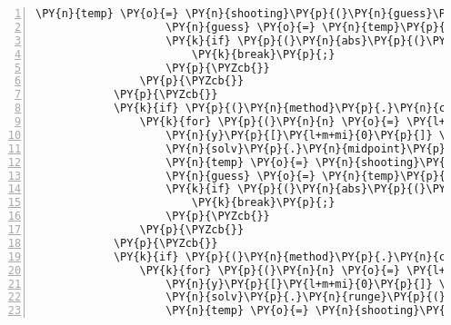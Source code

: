 \begin{Verbatim}[commandchars=\\\{\},numbers=left,firstnumber=1,stepnumber=1]
					\PY{n}{temp} \PY{o}{=} \PY{n}{shooting}\PY{p}{(}\PY{n}{guess}\PY{p}{,} \PY{n}{y}\PY{p}{,} \PY{n}{d}\PY{p}{)}\PY{p}{;}
					\PY{n}{guess} \PY{o}{=} \PY{n}{temp}\PY{p}{[}\PY{l+m+mi}{0}\PY{p}{]}\PY{p}{;}
					\PY{k}{if} \PY{p}{(}\PY{n}{abs}\PY{p}{(}\PY{n}{temp}\PY{p}{[}\PY{l+m+mi}{1}\PY{p}{]}\PY{p}{)}\PY{o}{\PYZlt{}}\PY{n}{tol}\PY{p}{)}\PY{p}{\PYZob{}} \PY{c+c1}{// finish the loop when sufficently close}
						\PY{k}{break}\PY{p}{;}
					\PY{p}{\PYZcb{}}
				\PY{p}{\PYZcb{}}
			\PY{p}{\PYZcb{}}
			\PY{k}{if} \PY{p}{(}\PY{n}{method}\PY{p}{.}\PY{n}{compare}\PY{p}{(}\PY{l+s}{\PYZdq{}}\PY{l+s}{midpoint}\PY{l+s}{\PYZdq{}}\PY{p}{)} \PY{o}{=}\PY{o}{=} \PY{l+m+mi}{0}\PY{p}{)}\PY{p}{\PYZob{}}
				\PY{k}{for} \PY{p}{(}\PY{n}{n} \PY{o}{=} \PY{l+m+mi}{0}\PY{p}{;} \PY{n}{n} \PY{o}{\PYZlt{}} \PY{l+m+mi}{500}\PY{p}{;} \PY{n}{n}\PY{o}{+}\PY{o}{+}\PY{p}{)}\PY{p}{\PYZob{}}
					\PY{n}{y}\PY{p}{[}\PY{l+m+mi}{0}\PY{p}{]} \PY{o}{=} \PY{l+m+mf}{0.}\PY{p}{;} \PY{n}{y}\PY{p}{[}\PY{l+m+mi}{1}\PY{p}{]} \PY{o}{=} \PY{n}{guess}\PY{p}{;} \PY{n}{y}\PY{p}{[}\PY{l+m+mi}{2}\PY{p}{]} \PY{o}{=} \PY{l+m+mf}{0.}\PY{p}{;} \PY{n}{y}\PY{p}{[}\PY{l+m+mi}{3}\PY{p}{]} \PY{o}{=} \PY{l+m+mf}{1.}\PY{p}{;}
					\PY{n}{solv}\PY{p}{.}\PY{n}{midpoint}\PY{p}{(}\PY{n}{y}\PY{p}{,} \PY{n}{f}\PY{p}{,} \PY{n}{j}\PY{p}{)}\PY{p}{;}
					\PY{n}{temp} \PY{o}{=} \PY{n}{shooting}\PY{p}{(}\PY{n}{guess}\PY{p}{,} \PY{n}{y}\PY{p}{,} \PY{n}{d}\PY{p}{)}\PY{p}{;}
					\PY{n}{guess} \PY{o}{=} \PY{n}{temp}\PY{p}{[}\PY{l+m+mi}{0}\PY{p}{]}\PY{p}{;}
					\PY{k}{if} \PY{p}{(}\PY{n}{abs}\PY{p}{(}\PY{n}{temp}\PY{p}{[}\PY{l+m+mi}{1}\PY{p}{]}\PY{p}{)}\PY{o}{\PYZlt{}}\PY{n}{tol}\PY{p}{)}\PY{p}{\PYZob{}}
						\PY{k}{break}\PY{p}{;}
					\PY{p}{\PYZcb{}}
				\PY{p}{\PYZcb{}}
			\PY{p}{\PYZcb{}}
			\PY{k}{if} \PY{p}{(}\PY{n}{method}\PY{p}{.}\PY{n}{compare}\PY{p}{(}\PY{l+s}{\PYZdq{}}\PY{l+s}{runge\PYZhy{}kutta}\PY{l+s}{\PYZdq{}}\PY{p}{)} \PY{o}{=}\PY{o}{=} \PY{l+m+mi}{0}\PY{p}{)}\PY{p}{\PYZob{}}
				\PY{k}{for} \PY{p}{(}\PY{n}{n} \PY{o}{=} \PY{l+m+mi}{0}\PY{p}{;} \PY{n}{n} \PY{o}{\PYZlt{}} \PY{l+m+mi}{500}\PY{p}{;} \PY{n}{n}\PY{o}{+}\PY{o}{+}\PY{p}{)}\PY{p}{\PYZob{}}
					\PY{n}{y}\PY{p}{[}\PY{l+m+mi}{0}\PY{p}{]} \PY{o}{=} \PY{l+m+mf}{0.}\PY{p}{;} \PY{n}{y}\PY{p}{[}\PY{l+m+mi}{1}\PY{p}{]} \PY{o}{=} \PY{n}{guess}\PY{p}{;} \PY{n}{y}\PY{p}{[}\PY{l+m+mi}{2}\PY{p}{]} \PY{o}{=} \PY{l+m+mf}{0.}\PY{p}{;} \PY{n}{y}\PY{p}{[}\PY{l+m+mi}{3}\PY{p}{]} \PY{o}{=} \PY{l+m+mf}{1.}\PY{p}{;}
					\PY{n}{solv}\PY{p}{.}\PY{n}{runge}\PY{p}{(}\PY{n}{y}\PY{p}{,} \PY{n}{f}\PY{p}{,} \PY{n}{j}\PY{p}{)}\PY{p}{;}
					\PY{n}{temp} \PY{o}{=} \PY{n}{shooting}\PY{p}{(}\PY{n}{guess}\PY{p}{,} \PY{n}{y}\PY{p}{,} \PY{n}{d}\PY{p}{)}\PY{p}{;}

\end{Verbatim}
